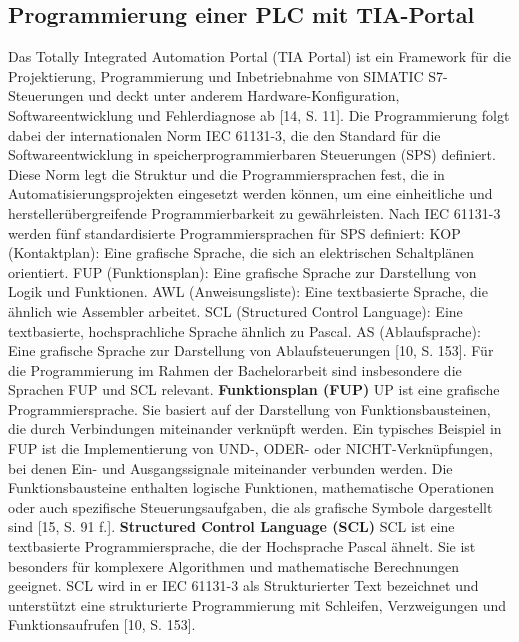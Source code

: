 \subsection{Programmierung einer PLC mit TIA-Portal}
Das Totally Integrated Automation Portal (TIA Portal) ist ein Framework für die Projektierung, Programmierung und Inbetriebnahme von SIMATIC S7-Steuerungen und deckt unter 
anderem Hardware-Konfiguration, Softwareentwicklung und Fehlerdiagnose ab [14, S. 11]. Die 
Programmierung folgt dabei der internationalen Norm IEC 61131-3, die den Standard für die 
Softwareentwicklung in speicherprogrammierbaren Steuerungen (SPS) definiert. Diese Norm 
legt die Struktur und die Programmiersprachen fest, die in Automatisierungsprojekten eingesetzt werden können, um eine einheitliche und herstellerübergreifende Programmierbarkeit zu 
gewährleisten.
Nach IEC 61131-3 werden fünf standardisierte Programmiersprachen für SPS definiert:
KOP (Kontaktplan): Eine grafische Sprache, die sich an elektrischen Schaltplänen orientiert.
FUP (Funktionsplan): Eine grafische Sprache zur Darstellung von Logik und Funktionen.
AWL (Anweisungsliste): Eine textbasierte Sprache, die ähnlich wie Assembler arbeitet.
SCL (Structured Control Language): Eine textbasierte, hochsprachliche Sprache ähnlich zu 
Pascal.
AS (Ablaufsprache): Eine grafische Sprache zur Darstellung von Ablaufsteuerungen [10, S. 153].
Für die Programmierung im Rahmen der Bachelorarbeit sind insbesondere die Sprachen FUP 
und SCL relevant.
\textbf{Funktionsplan (FUP)}
UP ist eine grafische Programmiersprache. Sie basiert auf der Darstellung von Funktionsbausteinen, die durch Verbindungen miteinander verknüpft werden.
Ein typisches Beispiel in FUP ist die Implementierung von UND-, ODER- oder NICHT-Verknüpfungen, bei denen Ein- und Ausgangssignale miteinander verbunden werden. Die Funktionsbausteine enthalten logische Funktionen, mathematische Operationen oder auch spezifische 
Steuerungsaufgaben, die als grafische Symbole dargestellt sind [15, S. 91 f.].
\textbf{Structured Control Language (SCL)}
SCL ist eine textbasierte Programmiersprache, die der Hochsprache Pascal ähnelt. Sie ist besonders für komplexere Algorithmen und mathematische Berechnungen geeignet. SCL wird in er IEC 61131-3 als Strukturierter Text bezeichnet und unterstützt eine strukturierte Programmierung mit Schleifen, Verzweigungen und Funktionsaufrufen [10, S. 153].
